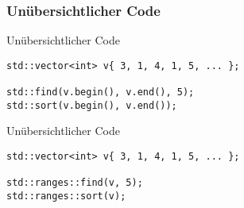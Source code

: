 \subsubsection{Unübersichtlicher Code}

\begin{frame}[fragile]{Unübersichtlicher Code}
    \begin{verbatim}
std::vector<int> v{ 3, 1, 4, 1, 5, ... };

std::find(v.begin(), v.end(), 5);
std::sort(v.begin(), v.end());
    \end{verbatim}
\end{frame}

\begin{frame}[fragile]{Unübersichtlicher Code}
    \begin{verbatim}
std::vector<int> v{ 3, 1, 4, 1, 5, ... };

std::ranges::find(v, 5);
std::ranges::sort(v);
    \end{verbatim}
\end{frame}